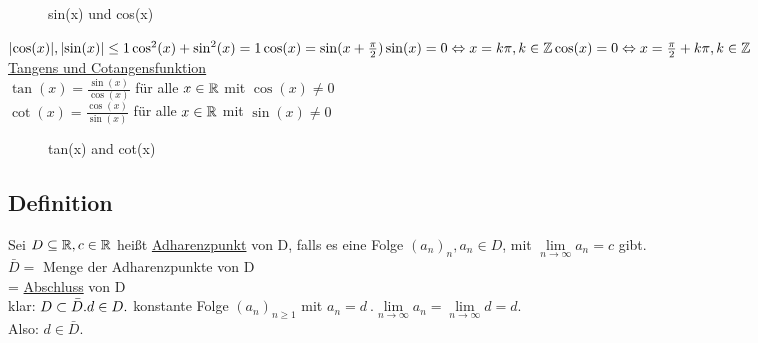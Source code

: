 \begin{enumerate}[a)]
\begin{figure}[h!]
\centering
{}
\caption[Sinus und Cosinus]{sin(x) und cos(x)}
\end{figure}
$\lvert \cos(x) \rvert, \lvert \sin(x) \rvert \leq 1\\
\cos^2(x) + \sin^2(x) = 1\\
\cos(x) = \sin(x + \frac{\pi}{2})\\
\sin(x) = 0 \Leftrightarrow x = k \pi, k \in \mathbb{Z}\\
\cos(x) = 0 \Leftrightarrow x = \frac{\pi}{2} + k \pi, k \in \mathbb{Z}$\\
\underline{Tangens und Cotangensfunktion}\\
$\tan(x) = \frac{\sin(x)}{\cos(x)}$ für alle $x \in \mathbb{R}$ mit $\cos(x) \not = 0$\\
$\cot(x) = \frac{\cos(x)}{\sin(x)}$ für alle $x \in \mathbb{R}$ mit $\sin(x) \not = 0$\\
\begin{figure}[h!]
\centering
{}
\caption[Tangens und Kotangens]{tan(x) and cot(x)}
\end{figure}
\end{enumerate}
\subsection{Definition}
Sei $D \subseteq \mathbb{R} , c \in \mathbb{R}$ hei\ss t \underline{Adharenzpunkt} von D, falls es eine Folge $(a_n)_n , a_n \in D$, mit $\lim\limits_{n \rightarrow \infty} a_n = c$ gibt.\\
$\bar{D} =$ Menge der Adharenzpunkte von D\\
\phantom{D} = \underline{Abschluss} von D\\
klar: $D \subset \bar{D}.\\
d \in D.$ konstante Folge $(a_n)_{n \geq 1}$ mit $a_n = d \ . \lim\limits_{n \rightarrow \infty} a_n = \lim\limits_{n \rightarrow \infty} d = d.$\\
Also: $d \in \bar{D}$.
